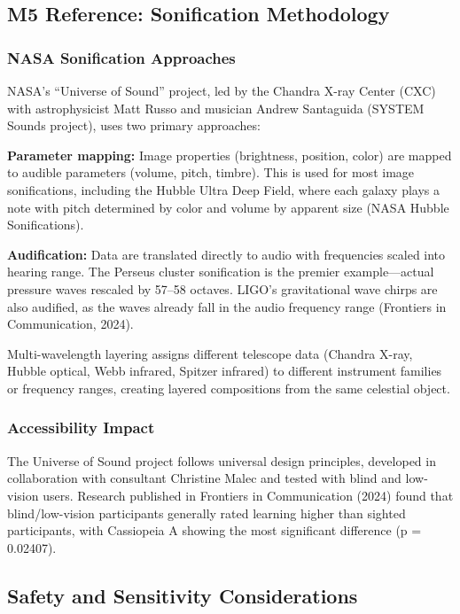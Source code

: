 \documentclass[11pt,letterpaper]{article}
\begin{document}
\subsection{M5 Reference: Sonification Methodology}

\subsubsection{NASA Sonification Approaches}
NASA's ``Universe of Sound'' project, led by the Chandra X-ray Center (CXC) with astrophysicist Matt Russo and musician Andrew Santaguida (SYSTEM Sounds project), uses two primary approaches:

\textbf{Parameter mapping:} Image properties (brightness, position, color) are mapped to audible parameters (volume, pitch, timbre). This is used for most image sonifications, including the Hubble Ultra Deep Field, where each galaxy plays a note with pitch determined by color and volume by apparent size (NASA Hubble Sonifications).

\textbf{Audification:} Data are translated directly to audio with frequencies scaled into hearing range. The Perseus cluster sonification is the premier example---actual pressure waves rescaled by 57--58 octaves. LIGO's gravitational wave chirps are also audified, as the waves already fall in the audio frequency range (Frontiers in Communication, 2024).

Multi-wavelength layering assigns different telescope data (Chandra X-ray, Hubble optical, Webb infrared, Spitzer infrared) to different instrument families or frequency ranges, creating layered compositions from the same celestial object.

\subsubsection{Accessibility Impact}
The Universe of Sound project follows universal design principles, developed in collaboration with consultant Christine Malec and tested with blind and low-vision users. Research published in Frontiers in Communication (2024) found that blind/low-vision participants generally rated learning higher than sighted participants, with Cassiopeia A showing the most significant difference (p = 0.02407).

\subsection{Safety and Sensitivity Considerations}
\end{document}
